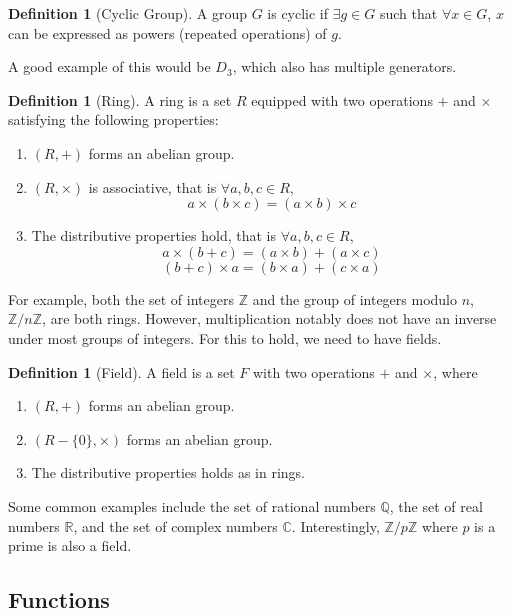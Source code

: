 \documentclass[12pt]{article}
\theoremstyle{definition}
\newtheorem{definition}[theorem]{Definition}
\begin{document}
\begin{definition}[Cyclic Group]
    A group $G$ is cyclic if $\exists g \in G$ such that $\forall x \in G$, $x$ can be expressed as powers (repeated operations) of $g$. 
\end{definition}

A good example of this would be $D_3$, which also has multiple generators. 
\vspace{12pt}

\begin{definition}[Ring]
    A ring is a set $R$ equipped with two operations $+$ and $\times$ satisfying the following properties:
    \begin{enumerate}
        \item $(R, +)$ forms an abelian group. 
        \item $(R, \times)$ is associative, that is $\forall a, b, c \in R$, $$a \times (b \times c) = (a \times b) \times c$$ 
        \item The distributive properties hold, that is $\forall a, b, c \in R$, $$a \times (b + c) = (a \times b) + (a \times c) $$$$ (b + c) \times a = (b \times a) + (c \times a)$$
    \end{enumerate}
\end{definition}

For example, both the set of integers $\mathbb{Z}$ and the group of integers modulo $n$, $\mathbb{Z}/n\mathbb{Z}$, are both rings. However, multiplication notably does not have an inverse under most groups of integers. For this to hold, we need to have fields. 

\begin{definition}[Field]
    A field is a set $F$ with two operations $+$ and $\times$, where
    \begin{enumerate}
        \item $(R, +)$ forms an abelian group. 
        \item $(R - \{0\}, \times)$ forms an abelian group. 
        \item The distributive properties holds as in rings. 
    \end{enumerate}
\end{definition}

Some common examples include the set of rational numbers $\mathbb{Q}$, the set of real numbers $\mathbb{R}$, and the set of complex numbers $\mathbb{C}$. Interestingly, $\mathbb{Z}/p\mathbb{Z}$ where $p$ is a prime is also a field.

\subsection{Functions}
\end{document}
